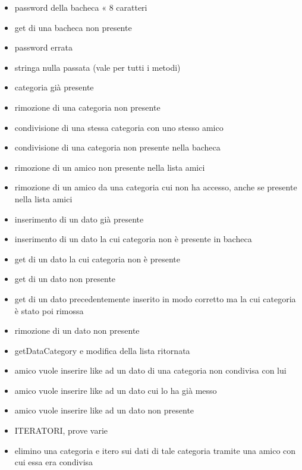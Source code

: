 \documentclass[10pt, a4paper]{article}
\begin{document}
\begin{itemize}
\item password della bacheca « 8 caratteri
\item get di una bacheca non presente
\item password errata
\item stringa nulla passata (vale per tutti i metodi)
\item categoria già presente
\item rimozione di una categoria non presente
\item condivisione di una stessa categoria con uno stesso amico
\item condivisione di una categoria non presente nella bacheca
\item rimozione di un amico non presente nella lista amici
\item rimozione di un amico da una categoria cui non ha accesso, anche se presente nella lista amici
\item inserimento di un dato già presente
\item inserimento di un dato la cui categoria non è presente in bacheca
\item get di un dato la cui categoria non è presente
\item get di un dato non presente
\item get di un dato precedentemente inserito in modo corretto ma la cui categoria è stato poi rimossa
\item rimozione di un dato non presente
\item getDataCategory e modifica della lista ritornata
\item amico vuole inserire like ad un dato di una categoria non condivisa con lui
\item amico vuole inserire like ad un dato cui lo ha già messo
\item amico vuole inserire like ad un dato non presente
\item ITERATORI, prove varie
\item elimino una categoria e itero sui dati di tale categoria tramite una amico con cui essa era condivisa
\end{itemize}
 
\end{document}
